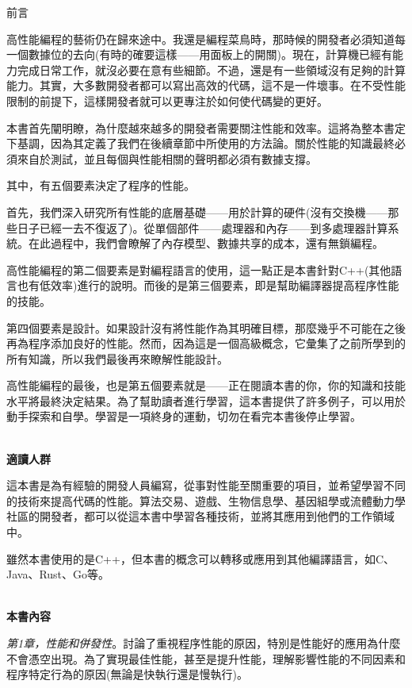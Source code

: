 \begin{flushright}
 前言
\end{flushright}

高性能編程的藝術仍在歸來途中。我還是編程菜鳥時，那時候的開發者必須知道每一個數據位的去向(有時的確要這樣——用面板上的開關)。現在，計算機已經有能力完成日常工作，就沒必要在意有些細節。不過，還是有一些領域沒有足夠的計算能力。其實，大多數開發者都可以寫出高效的代碼，這不是一件壞事。在不受性能限制的前提下，這樣開發者就可以更專注於如何使代碼變的更好。

本書首先闡明瞭，為什麼越來越多的開發者需要關注性能和效率。這將為整本書定下基調，因為其定義了我們在後續章節中所使用的方法論。關於性能的知識最終必須來自於測試，並且每個與性能相關的聲明都必須有數據支撐。

其中，有五個要素決定了程序的性能。

首先，我們深入研究所有性能的底層基礎——用於計算的硬件(沒有交換機——那些日子已經一去不復返了)。從單個部件——處理器和內存——到多處理器計算系統。在此過程中，我們會瞭解了內存模型、數據共享的成本，還有無鎖編程。

高性能編程的第二個要素是對編程語言的使用，這一點正是本書針對C++(其他語言也有低效率)進行的說明。而後的是第三個要素，即是幫助編譯器提高程序性能的技能。

第四個要素是設計。如果設計沒有將性能作為其明確目標，那麼幾乎不可能在之後再為程序添加良好的性能。然而，因為這是一個高級概念，它彙集了之前所學到的所有知識，所以我們最後再來瞭解性能設計。

高性能編程的最後，也是第五個要素就是——正在閱讀本書的你，你的知識和技能水平將最終決定結果。為了幫助讀者進行學習，這本書提供了許多例子，可以用於動手探索和自學。學習是一項終身的運動，切勿在看完本書後停止學習。

\hspace*{\fill} \\ %
\noindent\textbf{適讀人群}

這本書是為有經驗的開發人員編寫，從事對性能至關重要的項目，並希望學習不同的技術來提高代碼的性能。算法交易、遊戲、生物信息學、基因組學或流體動力學社區的開發者，都可以從這本書中學習各種技術，並將其應用到他們的工作領域中。

雖然本書使用的是C++，但本書的概念可以轉移或應用到其他編譯語言，如C、Java、Rust、Go等。

\hspace*{\fill} \\ %
\textbf{本書內容}

\textit{第1章，性能和併發性}。討論了重視程序性能的原因，特別是性能好的應用為什麼不會憑空出現。為了實現最佳性能，甚至是提升性能，理解影響性能的不同因素和程序特定行為的原因(無論是快執行還是慢執行)。

